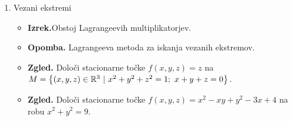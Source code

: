 \begin{enumerate}
    \item Vezani ekstremi
    
    \begin{itemize}
        \item \textbf{Izrek.}Obstoj Lagrangeevih multiplikatorjev.
        \item \textbf{Opomba.} Lagrangeeva metoda za iskanja vezanih ekstremov.
        \item \textbf{Zgled.} Določi stacionarne točke $f(x,y,z)=z$ na $M = \left\{(x,y,z) \in \mathbb{R}^3 \ | \ x^2+y^2+z^2=1; \ x+ y + z = 0\right\}$.
        \item \textbf{Zgled.} Določi stacionarne točke  $f(x,y,z)= x^2 - xy +y^2 - 3x +4$ na robu $x^2 + y^2 = 9$. 
    \end{itemize}
\end{enumerate}